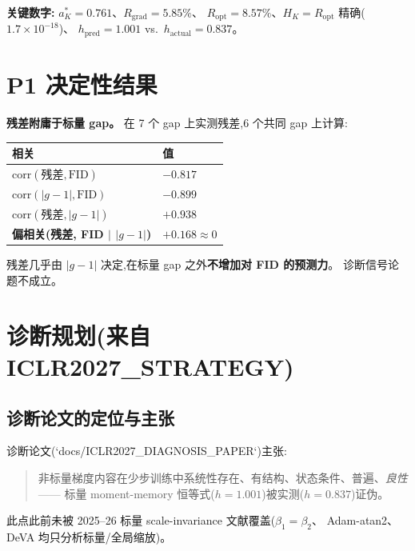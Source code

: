\documentclass[UTF8,11pt,a4paper]{ctexart}
\begin{document}
\textbf{关键数字:} $a_K^*{=}0.761$、$R_{\mathrm{grad}}{=}5.85\%$、
$R_{\mathrm{opt}}{=}8.57\%$、$H_K{=}R_{\mathrm{opt}}$ 精确($1.7\times10^{-18}$)、
$h_{\mathrm{pred}}{=}1.001$ vs.\ $h_{\mathrm{actual}}{=}0.837$。

\section{P1 决定性结果}
\label{sec:p1}

\textbf{残差附庸于标量 gap。} 在 7 个 gap 上实测残差,6 个共同 gap 上计算:

\begin{center}
\begin{tabular}{@{}ll@{}}
\toprule
相关 & 值 \\
\midrule
$\mathrm{corr}(\text{残差},\text{FID})$ & $-0.817$ \\
$\mathrm{corr}(|g-1|,\text{FID})$ & $-0.899$ \\
$\mathrm{corr}(\text{残差},|g-1|)$ & $+0.938$ \\
\textbf{偏相关(残差, FID $|$ $|g-1|$)} & \textbf{$+0.168\approx 0$} \\
\bottomrule
\end{tabular}
\end{center}

残差几乎由 $|g-1|$ 决定,在标量 gap 之外\textbf{不增加对 FID 的预测力}。
诊断信号论题不成立。

\section{诊断规划(来自 ICLR2027\_STRATEGY)}
\label{sec:plan}

\subsection{诊断论文的定位与主张}
诊断论文(`docs/ICLR2027\_DIAGNOSIS\_PAPER`)主张:
\begin{quote}
非标量梯度内容在少步训练中系统性存在、有结构、状态条件、普遍、\emph{良性}——
标量 moment-memory 恒等式($h{=}1.001$)被实测($h{=}0.837$)证伪。
\end{quote}
此点此前未被 2025--26 标量 scale-invariance 文献覆盖($\beta_1{=}\beta_2$、
Adam-atan2、DeVA 均只分析标量/全局缩放)。
\end{document}
